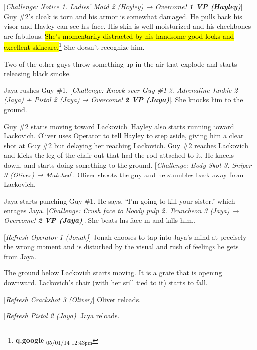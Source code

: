 {[}\textit{Challenge: Notice 1.  Ladies' Maid 2 (Hayley) → Overcome! }\textit{\textbf{1 VP (Hayley)}}{]} Guy \#2's cloak is torn and his armor is somewhat damaged.  He pulls back his visor and Hayley can see his face.  His skin is well moisturized and his cheekbones are fabulous.  \hl{She's momentarily distracted by his handsome good looks and excellent skincare.}\footnote{\textbf{q.google } \textsubscript{05/01/14 12:43pm}}  She doesn't recognize him.



Two of the other guys throw something up in the air that explode and starts releasing black smoke.



Jaya rushes Guy \#1.  {[}\textit{Challenge: Knock over Guy \#1 2.  Adrenaline Junkie 2 (Jaya) + Pistol 2 (Jaya)  → Overcome! }\textit{\textbf{2 VP (Jaya)}}{]}.  She knocks him to the ground.



Guy \#2 starts moving toward Lackovich.  Hayley also starts running toward Lackovich.  Oliver uses Operator to tell Hayley to step aside, giving him a clear shot at Guy \#2 but delaying her reaching Lackovich.  Guy \#2 reaches Lackovich and kicks the leg of the chair out that had the rod attached to it.  He kneels down, and starts doing something to the ground.  {[}\textit{Challenge: Body Shot 3.  Sniper 3 (Oliver) → Matched}{]}.  Oliver shoots the guy and he stumbles back away from Lackovich.



Jaya starts punching Guy \#1.  He says, ``I'm going to kill your sister.'' which enrages Jaya.  {[}\textit{Challenge: Crush face to bloody pulp 2.  Truncheon 3 (Jaya)  → Overcome! }\textit{\textbf{2 VP (Jaya)}}{]}.  She beats his face in and kills him..



{[}\textit{Refresh Operator 1 (Jonah)}{]} Jonah chooses to tap into Jaya's mind at precisely the wrong moment and is disturbed by the visual and rush of feelings he gets from Jaya.



The ground below Lackovich starts moving.  It is a grate that is opening downward.  Lackovich's chair (with her still tied to it) starts to fall.  



{[}\textit{Refresh Crackshot 3 (Oliver)}{]}  Oliver reloads.

{[}\textit{Refresh Pistol 2 (Jaya)}{]}  Jaya reloads.




